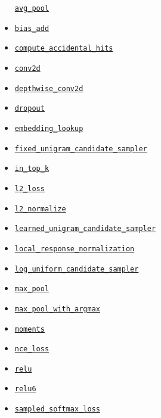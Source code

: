 \begin{itemize}
  \href{../../api_docs/python/nn.md\#avg_pool}{\texttt{avg\_pool}}
\item
  \href{../../api_docs/python/nn.md\#bias_add}{\texttt{bias\_add}}
\item
  \href{../../api_docs/python/nn.md\#compute_accidental_hits}{\texttt{compute\_accidental\_hits}}
\item
  \href{../../api_docs/python/nn.md\#conv2d}{\texttt{conv2d}}
\item
  \href{../../api_docs/python/nn.md\#depthwise_conv2d}{\texttt{depthwise\_conv2d}}
\item
  \href{../../api_docs/python/nn.md\#dropout}{\texttt{dropout}}
\item
  \href{../../api_docs/python/nn.md\#embedding_lookup}{\texttt{embedding\_lookup}}
\item
  \href{../../api_docs/python/nn.md\#fixed_unigram_candidate_sampler}{\texttt{fixed\_unigram\_candidate\_sampler}}
\item
  \href{../../api_docs/python/nn.md\#in_top_k}{\texttt{in\_top\_k}}
\item
  \href{../../api_docs/python/nn.md\#l2_loss}{\texttt{l2\_loss}}
\item
  \href{../../api_docs/python/nn.md\#l2_normalize}{\texttt{l2\_normalize}}
\item
  \href{../../api_docs/python/nn.md\#learned_unigram_candidate_sampler}{\texttt{learned\_unigram\_candidate\_sampler}}
\item
  \href{../../api_docs/python/nn.md\#local_response_normalization}{\texttt{local\_response\_normalization}}
\item
  \href{../../api_docs/python/nn.md\#log_uniform_candidate_sampler}{\texttt{log\_uniform\_candidate\_sampler}}
\item
  \href{../../api_docs/python/nn.md\#max_pool}{\texttt{max\_pool}}
\item
  \href{../../api_docs/python/nn.md\#max_pool_with_argmax}{\texttt{max\_pool\_with\_argmax}}
\item
  \href{../../api_docs/python/nn.md\#moments}{\texttt{moments}}
\item
  \href{../../api_docs/python/nn.md\#nce_loss}{\texttt{nce\_loss}}
\item
  \href{../../api_docs/python/nn.md\#relu}{\texttt{relu}}
\item
  \href{../../api_docs/python/nn.md\#relu6}{\texttt{relu6}}
\item
  \href{../../api_docs/python/nn.md\#sampled_softmax_loss}{\texttt{sampled\_softmax\_loss}}

\end{itemize}
